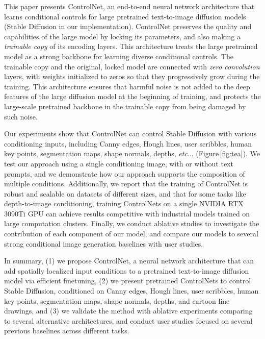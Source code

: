 \documentclass[10pt,twocolumn,letterpaper]{article}
\makeatletter
\DeclareRobustCommand\onedot{\futurelet\@let@token\@onedot}
\def\@onedot{\ifx\@let@token.\else.\null\fi\xspace}
\def\etc{\emph{etc}\onedot}
\makeatother
\begin{document}
	This paper presents ControlNet, an end-to-end neural
	network architecture that learns conditional controls for
	large pretrained text-to-image diffusion models (Stable
	Diffusion in our implementation).  ControlNet preserves the
	quality and capabilities of the large model by locking its
	parameters, and also making a {\em trainable copy} of its
	encoding layers. This architecture treats the large pretrained
	model as a strong backbone for learning diverse conditional
	controls.  The trainable copy and the original, locked model
	are connected with {\em zero convolution} layers, with weights
	initialized to zeros so that they progressively grow during
	the training. This architecture ensures that harmful noise is
	not added to the deep features of the large diffusion model at
	the beginning of training, and protects the large-scale
	pretrained backbone in the trainable copy from being damaged
	by such noise.
	
	
	Our experiments show that ControlNet can control Stable
	Diffusion with various conditioning inputs, including Canny
	edges, Hough lines, user scribbles, human key points,
	segmentation maps, shape normals, depths,
	\etc. (Figure\,\ref{fig:tea}).  We test our approach using a
	single conditioning image, with or without text prompts, and
	we demonstrate how our approach supports the composition of
	multiple conditions.  Additionally, we report that the
	training of ControlNet is robust and scalable on datasets of
	different sizes, and that for some tasks like depth-to-image
	conditioning, training ControlNets on a single NVIDIA RTX
	3090Ti GPU can achieve results competitive with industrial
	models trained on large computation clusters.  Finally, we
	conduct ablative studies to investigate the contribution of
	each component of our model, and compare our models to several
	strong conditional image generation baselines with user
	studies.
	
	In summary, (1) we propose ControlNet, a neural network
	architecture that can add spatially localized input conditions
	to a pretrained text-to-image diffusion model via efficient
	finetuning, (2) we present pretrained ControlNets to control
	Stable Diffusion, conditioned on Canny edges, Hough lines,
	user scribbles, human key points, segmentation maps, shape
	normals, depths, and cartoon line drawings, and (3) we
	validate the method with ablative experiments comparing to
	several alternative architectures, and conduct user studies
	focused on several previous baselines across different tasks.
	
\end{document}
